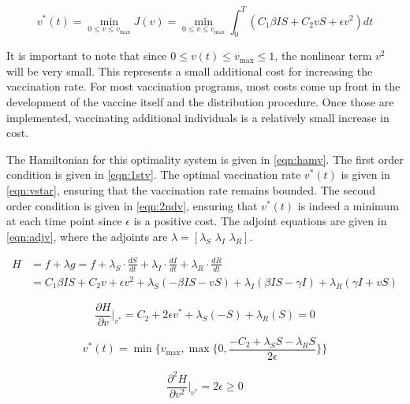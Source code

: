 \documentclass[12pt]{article}
\begin{document}
\begin{equation} \label{eqn:goalv}
	v^*(t) = \min\limits_{0 \leq v \leq v_{\max}} J(v) = \min\limits_{0 \leq v \leq v_{\max}} \int_0^T (C_1\beta IS + C_2vS + \epsilon v^2) dt 
\end{equation} 

It is important to note that since $0 \leq v(t) \leq v_{\max} \leq 1$, the nonlinear term $v^2$ will be very small. This represents a small additional cost for increasing the vaccination rate. For most vaccination programs, most costs come up front in the development of the vaccine itself and the distribution procedure. Once those are implemented, vaccinating additional individuals is a relatively small increase in cost. 

The Hamiltonian for this optimality system is given in \eqref{eqn:hamv}. The first order condition is given in \eqref{eqn:1stv}. The optimal vaccination rate $v^*(t)$ is given in \eqref{eqn:vstar}, ensuring that the vaccination rate remains bounded. The second order condition is given in \eqref{eqn:2ndv}, ensuring that $v^*(t)$ is indeed a minimum at each time point since $\epsilon$ is a positive cost. The adjoint equations are given in \eqref{eqn:adjv}, where the adjoints are $\lambda = [\lambda_S \,\, \lambda_I \,\, \lambda_R]$.

\begin{equation} \label{eqn:hamv}
	\begin{aligned}
		H &= f + \lambda g = f + \lambda_S \cdot \frac{dS}{dt} + \lambda_I \cdot \frac{dI}{dt} + \lambda_R \cdot \frac{dR}{dt} \\[5pt]
		&= C_1\beta IS + C_2v + \epsilon v^2 + \lambda_S (-\beta IS - vS) + \lambda_I (\beta IS - \gamma I) + \lambda_R (\gamma I + vS)
	\end{aligned}
\end{equation}

\begin{equation} \label{eqn:1stv}
	\frac{\partial H}{\partial v} \Big|_{v^*} = C_2 + 2\epsilon v^* + \lambda_S (-S) + \lambda_R (S) = 0
\end{equation}

\begin{equation} \label{eqn:vstar}
	v^*(t) = \min \Bigg\{ v_{\max}, \max \Big\{ 0, \frac{-C_2 + \lambda_SS - \lambda_RS}{2\epsilon} \Big\} \Bigg\}
\end{equation}

\begin{equation} \label{eqn:2ndv}
	\frac{\partial^2 H}{\partial v^2} \Big|_{v^*} = 2\epsilon \geq 0
\end{equation}
\end{document}
